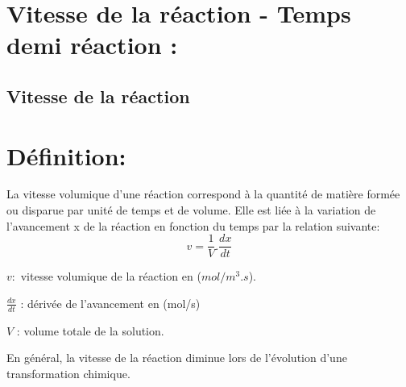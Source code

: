 \documentclass[12pt]{article}
\begin{document}
\section{Vitesse de la réaction - Temps demi réaction :  }
\subsection{Vitesse de la réaction}
\section*{Définition:}
La vitesse volumique d’une réaction correspond à la quantité de matière formée ou disparue par unité de temps et de volume.
Elle est liée à la variation de l’avancement x de la réaction en fonction du temps par la relation suivante:
$$v = \frac{1}{V}.\frac{dx}{dt}$$

$v : $ vitesse volumique de la réaction en ($mol/m^3.s$).

$\frac{dx}{dt}$ : dérivée de l'avancement en (mol/s)

$V$ : volume totale de la solution.

En général, la vitesse de la réaction diminue lors de l'évolution d'une transformation chimique. 
\end{document}
